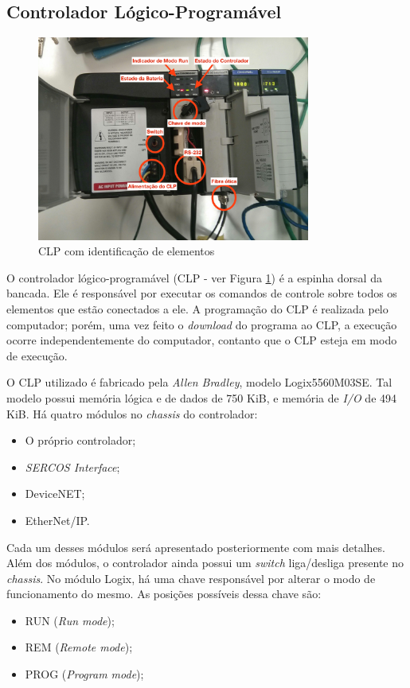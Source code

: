\subsection{Controlador Lógico-Programável}
\begin{figure}[!ht]
  \centering
    \includegraphics[width=0.8\textwidth]{figs/fundamentos/CLP.jpg}
    \caption{CLP com identificação de elementos\label{CLPcomentado}}
\end{figure}

O controlador lógico-programável (CLP - ver Figura \ref{CLPcomentado}) é a espinha dorsal da bancada. Ele é responsável por executar os comandos de controle sobre todos os elementos que estão conectados a ele. A programação do CLP é realizada pelo computador; porém, uma vez feito o \textit{download} do programa ao CLP, a execução ocorre independentemente do computador, contanto que o CLP esteja em modo de execução.

O CLP utilizado é fabricado pela \textit{Allen Bradley}, modelo Logix5560M03SE. Tal modelo possui memória lógica e de dados de 750 KiB, e memória de \textit{I/O} de 494 KiB. Há quatro módulos no \textit{chassis} do controlador:
\begin{itemize}
  \item O próprio controlador;
  \item \textit{SERCOS Interface};
  \item DeviceNET;
  \item EtherNet/IP.
\end{itemize}

Cada um desses módulos será apresentado posteriormente com mais detalhes. Além dos módulos, o controlador ainda possui um \textit{switch} liga/desliga presente no \textit{chassis}. No módulo Logix, há uma chave responsável por alterar o modo de funcionamento do mesmo. As posições possíveis dessa chave são:
\begin{itemize}
  \item RUN (\textit{Run mode});
  \item REM (\textit{Remote mode});
  \item PROG (\textit{Program mode});
\end{itemize}

